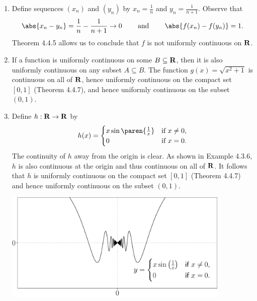 \documentclass{lew98_solutions}
\begin{document}
\begin{solution}
    \begin{enumerate}
        \item Define sequences \( (x_n) \) and \( (y_n) \) by \( x_n = \tfrac{1}{n} \) and \( y_n = \tfrac{1}{n+1} \). Observe that
        \[
            \abs{x_n - y_n} = \frac{1}{n} - \frac{1}{n+1} \to 0 \hspaceand \abs{f(x_n) - f(y_n)} = 1.
        \]
        Theorem 4.4.5 allows us to conclude that \( f \) is not uniformly continuous on \( \mathbf{R} \).

        \item If a function is uniformly continuous on some \( B \subseteq \mathbf{R} \), then it is also uniformly continuous on any subset \( A \subseteq B \). The function \( g(x) = \sqrt{x^2 + 1} \) is continuous on all of \( \mathbf{R} \), hence uniformly continuous on the compact set \( [0, 1] \) (Theorem 4.4.7), and hence uniformly continuous on the subset \( (0, 1) \).

        \item Define \( h : \mathbf{R} \to \mathbf{R} \) by
        \[
            h(x) = \begin{cases}
                x \sin \paren{ \tfrac{1}{x} } & \text{if } x \neq 0, \\
                0 & \text{if } x = 0.
            \end{cases}
        \]
        The continuity of \( h \) away from the origin is clear. As shown in Example 4.3.6, \( h \) is also continuous at the origin and thus continuous on all of \( \mathbf{R} \). It follows that \( h \) is uniformly continuous on the compact set \( [0, 1] \) (Theorem 4.4.7) and hence uniformly continuous on the subset \( (0, 1) \).
        \begin{center}
            \includegraphics[width=0.85\textwidth]{UA_Figures/UA_ex4_4_2_fig.pdf}
        \end{center}
    \end{enumerate}
\end{solution}
\end{document}
